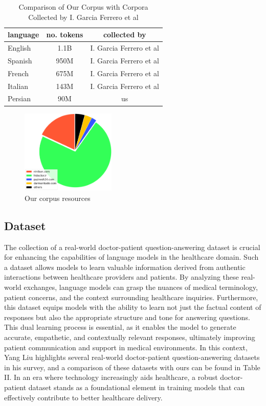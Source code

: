 \documentclass[conference]{IEEEtran}
\begin{document}
\begin{table}[ht]
	\centering
	\caption{Comparison of Our Corpus with Corpora Collected by I. Garcia Ferrero et al}
	\begin{tabular}{|l|c|c|}  %
		\hline
		language& no. tokens & collected by \\ \hline
		English & 1.1B & I. Garcia Ferrero et al \\ \hline
		Spanish & 950M & I. Garcia Ferrero et al  \\ \hline
		French & 675M & I. Garcia Ferrero et al  \\ \hline
		Italian& 143M &  I. Garcia Ferrero et al  \\ \hline
		Persian& 90M & us	\\ \hline
	\end{tabular}
	\label{tab:model_results_on_mcqa}
\end{table}

\begin{figure}[htbp]
	\centerline{\includegraphics[width=0.4\textwidth]{fig1.png}}
	\caption{Our corpus resources}
	\label{fig1}
\end{figure}

\subsection{Dataset}
The collection of a real-world doctor-patient question-answering dataset is crucial for enhancing the capabilities of language models in the healthcare domain. Such a dataset allows models to learn valuable information derived from authentic interactions between healthcare providers and patients. By analyzing these real-world exchanges, language models can grasp the nuances of medical terminology, patient concerns, and the context surrounding healthcare inquiries. Furthermore, this dataset equips models with the ability to learn not just the factual content of responses but also the appropriate structure and tone for answering questions. This dual learning process is essential, as it enables the model to generate accurate, empathetic, and contextually relevant responses, ultimately improving patient communication and support in medical environments. In this context, Yang Liu \cite{b18} highlights several real-world doctor-patient question-answering datasets in his survey, and a comparison of these datasets with ours can be found in Table II. In an era where technology increasingly aids healthcare, a robust doctor-patient dataset stands as a foundational element in training models that can effectively contribute to better healthcare delivery.
\end{document}
